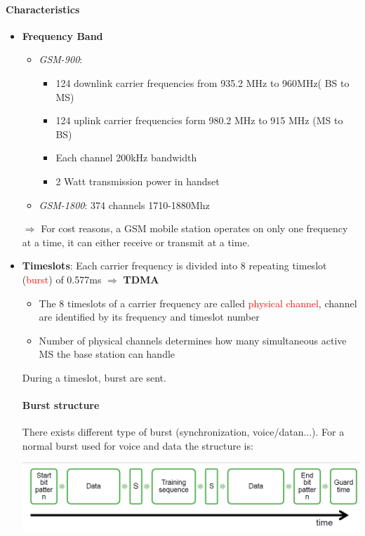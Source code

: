 \paragraph{Characteristics}

\begin{itemize}
    \item \textbf{Frequency Band}
        \begin{itemize}
            \item \textit{GSM-900}:
                \begin{itemize}
                    \item 124 downlink carrier frequencies from 935.2 MHz to 960MHz( BS to MS)
                    \item 124 uplink carrier frequencies form 980.2 MHz to 915 MHz (MS to BS)
                    \item Each channel 200kHz bandwidth
                    \item 2 Watt transmission power in handset
                \end{itemize}

            \item \textit{GSM-1800}: 374 channels 1710-1880Mhz
        \end{itemize}

        $\Rightarrow$ For cost reasons, a GSM mobile station operates on
        only one frequency at a time, it can either receive or transmit
        at a time.

    \item \textbf{Timeslots}: Each carrier frequency is divided into 8
        repeating timeslot (\textcolor{red}{burst}) of 0.577ms
        $\Rightarrow$ \textbf{TDMA}

        \begin{itemize}
            \item The 8 timeslots of a carrier frequency are called
                \textcolor{red}{physical channel}, channel are
                identified by its frequency and timeslot number

            \item Number of physical channels determines how many simultaneous active MS the 
                base station can handle
        \end{itemize}
        During a timeslot, burst are sent. 

        \paragraph{Burst structure} 
        There exists different type of burst (synchronization,
        voice/datan...). For a normal burst used for voice and data 
        the structure is:
        \begin{center}
            \includegraphics[width=0.8\linewidth]{img/burst-structure.png}
        \end{center}


\end{itemize}
